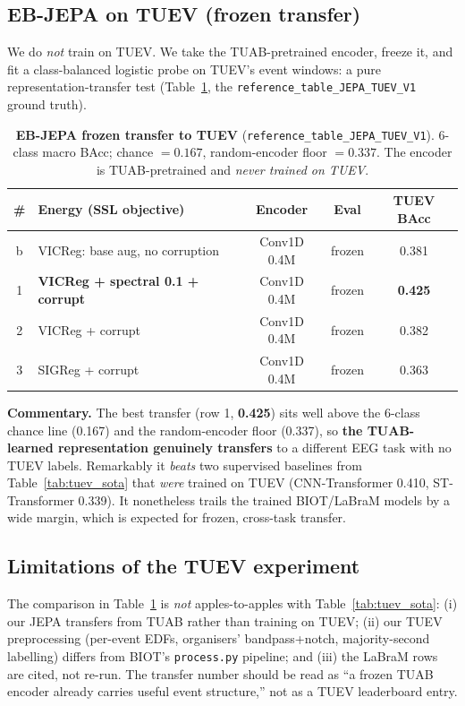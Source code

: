 \documentclass[10pt,a4paper]{article}
\newcommand{\best}[1]{\textbf{#1}}
\begin{document}
\subsection{EB-JEPA on TUEV (frozen transfer)}
We do \emph{not} train on TUEV. We take the TUAB-pretrained encoder, freeze it, and fit a class-balanced
logistic probe on TUEV's event windows: a pure representation-transfer test (Table~\ref{tab:tuev_jepa},
the \texttt{reference\_table\_JEPA\_TUEV\_V1} ground truth).

\begin{table}[h]\centering\small
\setlength{\tabcolsep}{6pt}\renewcommand{\arraystretch}{1.15}
\begin{tabular}{@{}clccc@{}}
\toprule
\textbf{\#} & \textbf{Energy (SSL objective)} & \textbf{Encoder} & \textbf{Eval} & \textbf{TUEV BAcc} \\
\midrule
b & VICReg: base aug, no corruption        & Conv1D 0.4M & frozen & 0.381 \\
1 & \best{VICReg + spectral 0.1 + corrupt}    & Conv1D 0.4M & frozen & \best{0.425} \\
2 & VICReg + corrupt                          & Conv1D 0.4M & frozen & 0.382 \\
3 & SIGReg + corrupt                          & Conv1D 0.4M & frozen & 0.363 \\
\bottomrule
\end{tabular}
\caption{\textbf{EB-JEPA frozen transfer to TUEV} (\texttt{reference\_table\_JEPA\_TUEV\_V1}). 6-class macro
BAcc; chance $=0.167$, random-encoder floor $=0.337$. The encoder is TUAB-pretrained and \emph{never trained
on TUEV}.}
\label{tab:tuev_jepa}
\end{table}

\textbf{Commentary.} The best transfer (row 1, \textbf{0.425}) sits well above the 6-class chance line
(0.167) and the random-encoder floor (0.337), so \textbf{the TUAB-learned representation genuinely transfers}
to a different EEG task with no TUEV labels. Remarkably it \emph{beats} two supervised baselines from
Table~\ref{tab:tuev_sota} that \emph{were} trained on TUEV (CNN-Transformer 0.410, ST-Transformer 0.339).
It nonetheless trails the trained BIOT/LaBraM models by a wide margin, which is expected for frozen,
cross-task transfer.

\subsection{Limitations of the TUEV experiment}
The comparison in Table~\ref{tab:tuev_jepa} is \emph{not} apples-to-apples with Table~\ref{tab:tuev_sota}:
(i) our JEPA transfers from TUAB rather than training on TUEV; (ii) our TUEV preprocessing (per-event EDFs,
organisers' bandpass+notch, majority-second labelling) differs from BIOT's \texttt{process.py} pipeline; and
(iii) the LaBraM rows are cited, not re-run. The transfer number should be read as ``a frozen TUAB encoder
already carries useful event structure,'' not as a TUEV leaderboard entry.
\end{document}
